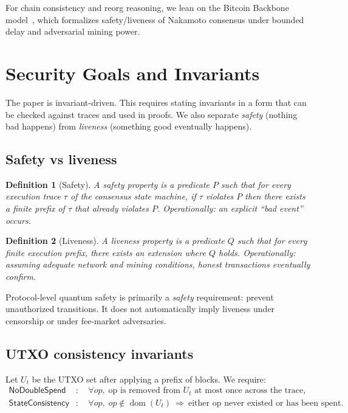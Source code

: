 \documentclass[11pt]{article}
\newtheorem{definition}{Definition}
\newcommand{\dom}{\operatorname{dom}}
\begin{document}
For chain consistency and reorg reasoning, we lean on the Bitcoin Backbone model~\cite{garay2015bitcoin}, which formalizes safety/liveness of Nakamoto consensus under bounded delay and adversarial mining power.

\section{Security Goals and Invariants}\label{sec:invariants}

The paper is invariant-driven. This requires stating invariants in a form that can be checked against traces and used in proofs.
We also separate \emph{safety} (nothing bad happens) from \emph{liveness} (something good eventually happens).

\subsection{Safety vs liveness}

\begin{definition}[Safety]
A safety property is a predicate $P$ such that for every execution trace $\tau$ of the consensus state machine, if $\tau$ violates $P$ then there exists a finite prefix of $\tau$ that already violates $P$.
Operationally: an explicit ``bad event'' occurs.
\end{definition}

\begin{definition}[Liveness]
A liveness property is a predicate $Q$ such that for every finite execution prefix, there exists an extension where $Q$ holds.
Operationally: assuming adequate network and mining conditions, honest transactions eventually confirm.
\end{definition}

Protocol-level quantum safety is primarily a \emph{safety} requirement: prevent unauthorized transitions.
It does not automatically imply liveness under censorship or under fee-market adversaries.

\subsection{UTXO consistency invariants}
Let $U_t$ be the UTXO set after applying a prefix of blocks.
We require:
\begin{align*}
\textsf{NoDoubleSpend} &:\quad \forall op,\; \text{op is removed from }U_t\text{ at most once across the trace},\\
\textsf{StateConsistency} &:\quad \forall op,\; op\notin\dom(U_t)\ \Rightarrow\ \text{either op never existed or has been spent}.
\end{align*}
\end{document}
